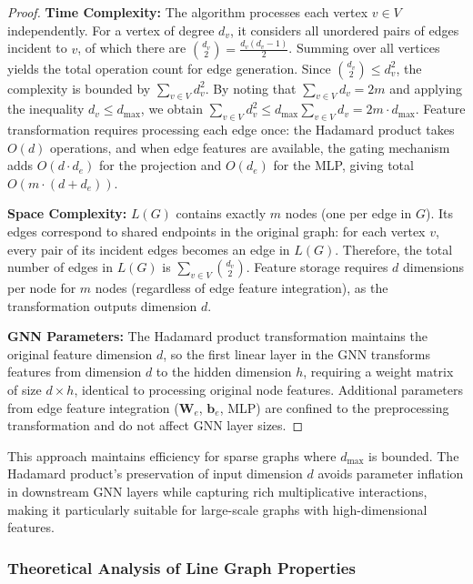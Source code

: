 \documentclass[pdflatex,sn-mathphys-num]{sn-jnl}%
\theoremstyle{thmstyleone}%
\theoremstyle{thmstyletwo}%
\theoremstyle{thmstylethree}%
\theoremstyle{plain} %
\theoremstyle{definition} %
\theoremstyle{remark} %
\theoremstyle{plain} %
\begin{document}
\begin{proof}
\textbf{Time Complexity:} The algorithm processes each vertex $v \in V$ independently. For a vertex of degree $d_v$, it considers all unordered pairs of edges incident to $v$, of which there are $\binom{d_v}{2} = \frac{d_v(d_v-1)}{2}$. Summing over all vertices yields the total operation count for edge generation. Since $\binom{d_v}{2} \leq d_v^2$, the complexity is bounded by $\sum_{v \in V} d_v^2$. By noting that $\sum_{v \in V} d_v = 2m$ and applying the inequality $d_v \leq d_{\max}$, we obtain $\sum_{v \in V} d_v^2 \leq d_{\max} \sum_{v \in V} d_v = 2m \cdot d_{\max}$. Feature transformation requires processing each edge once: the Hadamard product takes $O(d)$ operations, and when edge features are available, the gating mechanism adds $O(d \cdot d_e)$ for the projection and $O(d_e)$ for the MLP, giving total $O(m \cdot (d + d_e))$.

\textbf{Space Complexity:} $L(G)$ contains exactly $m$ nodes (one per edge in $G$). Its edges correspond to shared endpoints in the original graph: for each vertex $v$, every pair of its incident edges becomes an edge in $L(G)$. Therefore, the total number of edges in $L(G)$ is $\sum_{v \in V} \binom{d_v}{2}$. Feature storage requires $d$ dimensions per node for $m$ nodes (regardless of edge feature integration), as the transformation outputs dimension $d$.

\textbf{GNN Parameters:} The Hadamard product transformation maintains the original feature dimension $d$, so the first linear layer in the GNN transforms features from dimension $d$ to the hidden dimension $h$, requiring a weight matrix of size $d \times h$, identical to processing original node features. Additional parameters from edge feature integration ($\mathbf{W}_e$, $\mathbf{b}_e$, MLP) are confined to the preprocessing transformation and do not affect GNN layer sizes.
\end{proof}

This approach maintains efficiency for sparse graphs where $d_{\max}$ is bounded. The Hadamard product's preservation of input dimension $d$ avoids parameter inflation in downstream GNN layers while capturing rich multiplicative interactions, making it particularly suitable for large-scale graphs with high-dimensional features.


\subsubsection{Theoretical Analysis of Line Graph Properties}
\end{document}
